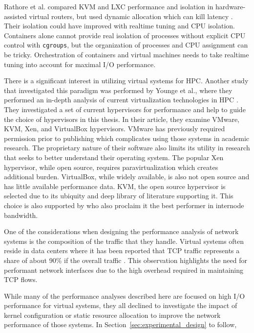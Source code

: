 Rathore et al. compared KVM and LXC performance and isolation in hardware-assisted virtual routers, but used dynamic allocation which can kill latency \autocite{rathore2013kvm}.
Their isolation could have improved with realtime tuning and CPU isolation.  
Containers alone cannot provide real isolation of processes without explicit CPU control with \texttt{cgroups}, but the organization of processes and CPU assignment can be tricky.
Orchestration of containers and virtual machines needs to take realtime tuning into account for maximal I/O performance.

There is a significant interest in utilizing virtual systems for HPC.  Another study that investigated this paradigm was performed by Younge et al., where they performed an in-depth analysis of current virtualization technologies in HPC \autocite{_younge_1}.
They investigated a set of current hypervisors for performance and help to guide the choice of hypervisors in this thesis. 
In their article, they examine VMware, KVM, Xen, and VirtualBox hypervisors. 
VMware has previously required permission prior to publishing which complicates using those systems in academic research.  
The proprietary nature of their software also limits its utility in research that seeks to better understand their operating system.  
The popular Xen hypervisor, while open source, requires paravirtualization which creates additional burden.
VirtualBox, while widely available, is also not open source and has little available performance data.  
KVM, the open source hypervisor is selected due to its ubiquity and deep library of literature supporting it.
This choice is also supported by \autocite{_younge_1} who also proclaim it the best performer in internode bandwidth.  

One of the considerations when designing the performance analysis of network systems is the composition of the traffic that they handle.  
Virtual systems often reside in data centers where it has been reported that TCP traffic represents a share of about 90\% if the overall traffic \autocite{haTCPCloud2013}.
This observation highlights the need for performant network interfaces due to the high overhead required in maintaining TCP flows.

While many of the performance analyses described here are focused on high I/O performance for virtual systems, they all declined to investigate the impact of kernel configuration or static resource allocation to improve the network performance of those systems.  
In Section~\ref{sec:experimental_design} to follow, 



\nocite{_dpdk_1, _adams_1, _chowdhury_1, _grinberg_1, seo2014performance, gomes2014performance, kivity2014osv, wang2011understanding}

